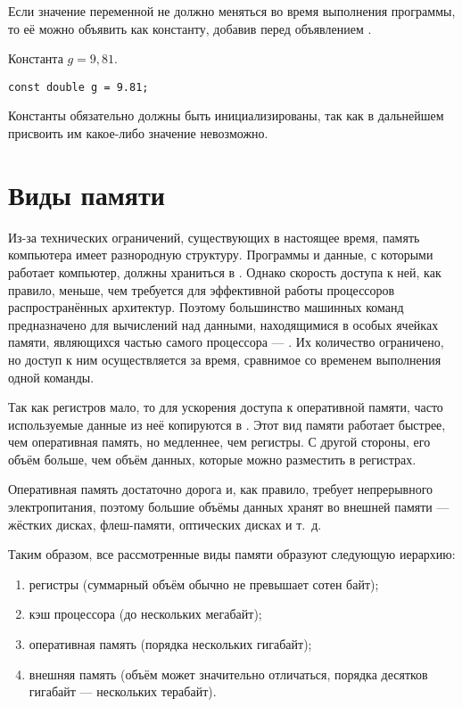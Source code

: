 
Если значение переменной не должно меняться во время выполнения
программы, то её можно объявить как константу, добавив перед
объявлением .

\begin{example}
Константа $g=9{,}81.$

\begin{lstlisting}
const double g = 9.81;
\end{lstlisting}
\end{example}

Константы обязательно должны быть инициализированы, так как в
дальнейшем присвоить им какое-либо значение невозможно.

\section{Виды памяти}


Из-за технических ограничений, существующих в настоящее время, память
компьютера имеет разнородную структуру. Программы и данные, с которыми
работает компьютер, должны храниться в
. Однако скорость доступа
к ней, как правило, меньше, чем требуется для эффективной работы
процессоров распространённых архитектур. Поэтому большинство машинных
команд предназначено для вычислений над данными, находящимися в особых
ячейках памяти, являющихся частью самого процессора — . Их количество ограничено, но доступ к ним
осуществляется за время, сравнимое со временем выполнения одной
команды.

Так как регистров мало, то для ускорения доступа к оперативной памяти,
часто используемые данные из неё копируются в .  Этот вид памяти работает быстрее, чем
оперативная память, но медленнее, чем регистры. С другой стороны, его
объём больше, чем объём данных, которые можно разместить в регистрах.

Оперативная память достаточно дорога и, как правило, требует
непрерывного электропитания, поэтому большие объёмы данных хранят во
внешней памяти — жёстких дисках, флеш-памяти, оптических дисках и
т.~д.

Таким образом, все рассмотренные виды памяти образуют следующую
иерархию:
\begin{enumerate}
\item регистры (суммарный объём обычно не превышает сотен байт);
\item кэш процессора (до нескольких мегабайт);
\item оперативная память (порядка нескольких гигабайт);
\item внешняя память (объём может значительно отличаться, порядка
  десятков гигабайт — нескольких терабайт).
\end{enumerate}

